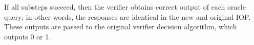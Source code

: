 If all substeps succeed, then the verifier obtains correct output of each oracle query; in other words, the responses are identical in the new and original IOP. These outputs are passed to the original verifier decision algorithm, which outputs 0 or 1.



